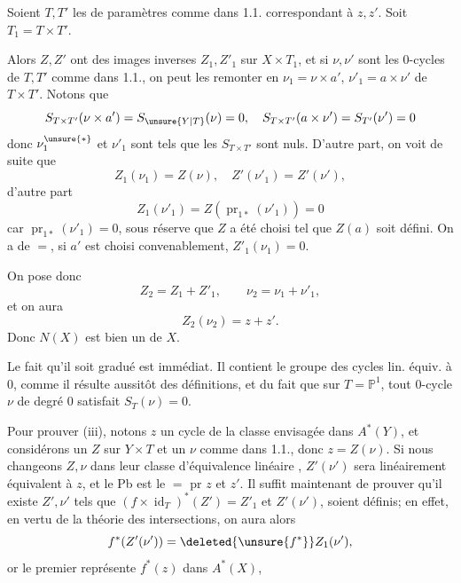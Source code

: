 Soient $T,T'$ les  de paramètres comme dans 1.1. correspondant à $z,z'$. Soit $T_1=T\times T'$.



Alors $Z,Z'$ ont des images inverses $Z_1,Z'_1$ sur $X\times T_1$, et si $\nu,\nu'$ sont les $0$-cycles de $T,T'$ comme dans 1.1., on peut les remonter en $\nu_1=\nu\times a'$, $\nu'_1=a\times\nu'$ de $T\times T'$. Notons que
\[
S_{T\times T'}(\nu\times a')=S_{\unsure{Y|T}}(\nu)=0,\quad S_{T\times T'}(a\times\nu')=S_{T'}(\nu')=0
\]
donc $\nu_1^{\unsure{*}}$ et $\nu'_1$ sont   tels que les $S_{T\times T'}$ sont nuls. D'autre part, on voit de suite que
\[
Z_1(\nu_1)=Z(\nu),\quad Z'(\nu'_1)=Z'(\nu'),
\]
 d'autre part
\[
Z_1(\nu'_1)=Z(\operatorname{pr}_{1*}(\nu'_1))=0
\]
car $\operatorname{pr}_{1*}(\nu'_1)=0$, sous réserve que $Z$ a été choisi tel que $Z(a)$ soit défini. On a de $=$, si $a'$ est choisi convenablement, $Z'_1(\nu_1)=0$.

On pose donc
\[
Z_2=Z_1+Z'_1,\qquad\nu_2=\nu_1+\nu'_1,
\]
et on aura
\[
Z_2(\nu_2)=z+z'.
\]
 Donc $N(X)$ est bien un  de $X$.




Le fait qu'il soit gradué est immédiat. Il contient le groupe des cycles lin. équiv. à $0$, comme il résulte aussitôt des définitions, et du fait que sur $T=\mathbb P^1$, tout $0$-cycle $\nu$ de degré $0$ satisfait $S_T(\nu)=0$. 

Pour prouver (iii), notons $z$ un cycle de la classe envisagée dans $A^*(Y)$, et considérons un $Z$ sur $Y\times T$ et un $\nu$ comme dans 1.1., donc $z=Z(\nu)$. Si nous changeons $Z,\nu$ dans leur classe d'équivalence linéaire , $Z'(\nu')$ sera linéairement équivalent à $z$, et le Pb est le $=$ pr $z$ et $z'$. Il suffit maintenant de prouver  qu'il existe $Z',\nu'$ tels que $(f\times\operatorname{id}_T)^*(Z')=Z'_1$ et $Z'(\nu')$,  soient définis; en effet, en vertu de la théorie des intersections, on aura alors
\[
f^*(Z'(\nu'))=\deleted{\unsure{f^*}}Z_1(\nu'),
\]
or le premier   représente $f^*(z)$ dans $A^*(X)$, 

